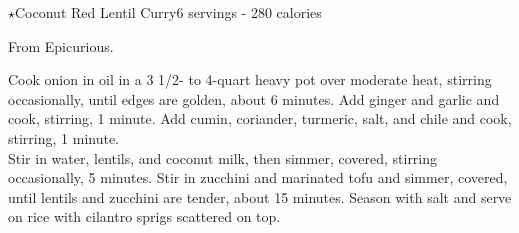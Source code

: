 \begin{recipe}{\texorpdfstring{$\star$}{str}Coconut Red Lentil Curry}{6 servings - 280 calories}{}

\freeform From Epicurious.


Cook onion in oil in a 3 1/2- to 4-quart heavy pot over moderate heat, stirring occasionally, until edges are golden, about 6 minutes. Add ginger and garlic and cook, stirring, 1 minute. Add cumin, coriander, turmeric, salt, and chile and cook, stirring, 1 minute.\\

Stir in water, lentils, and coconut milk, then simmer, covered, stirring occasionally, 5 minutes. Stir in zucchini and marinated tofu and simmer, covered, until lentils and zucchini are tender, about 15 minutes. Season with salt and serve on rice with cilantro sprigs scattered on top.

\end{recipe}